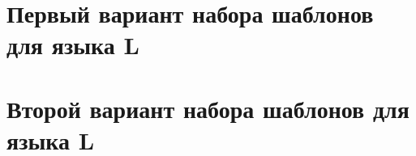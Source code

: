 \section{Первый вариант набора шаблонов для языка L}
\label{app:1}


\section{Второй вариант набора шаблонов для языка L}
\label{app:2}


